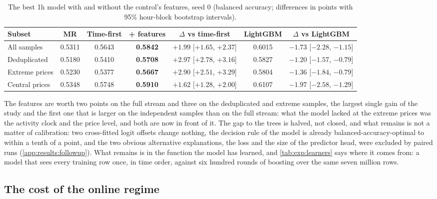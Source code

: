 \begin{table}[t]
\centering
\caption{The best 1h model with and without the control's features, seed 0 (balanced
accuracy; differences in points with 95\% hour-block bootstrap intervals).}
\label{tab:exp:handfeatures}
\small
\begin{fittable}\begin{tabular}{lcccccc}
\toprule
Subset & MR & Time-first & \textbf{+ features} & $\Delta$ vs time-first & LightGBM & $\Delta$ vs LightGBM \\
\midrule
All samples    & 0.5311 & 0.5643 & \textbf{0.5842} & $+1.99$ [$+1.65$, $+2.37$] & 0.6015 & $-1.73$ [$-2.28$, $-1.15$] \\
Deduplicated   & 0.5180 & 0.5410 & \textbf{0.5708} & $+2.97$ [$+2.78$, $+3.16$] & 0.5827 & $-1.20$ [$-1.57$, $-0.79$] \\
Extreme prices & 0.5230 & 0.5377 & \textbf{0.5667} & $+2.90$ [$+2.51$, $+3.29$] & 0.5804 & $-1.36$ [$-1.84$, $-0.79$] \\
Central prices & 0.5348 & 0.5748 & \textbf{0.5910} & $+1.62$ [$+1.28$, $+2.00$] & 0.6107 & $-1.97$ [$-2.58$, $-1.29$] \\
\bottomrule
\end{tabular}\end{fittable}
\end{table}

The features are worth two points on the full stream and three on the deduplicated and
extreme samples, the largest single gain of the study and the first one that is larger on
the independent samples than on the full stream: what the model lacked at the extreme
prices was the activity clock and the price level, and both are now in front of it.  The gap
to the trees is halved, not closed, and what remains is not a matter of calibration: two
cross-fitted logit offsets change nothing, the decision rule of the model is already
balanced-accuracy-optimal to within a tenth of a point, and the two obvious alternative
explanations, the loss and the size of the predictor head, were excluded by paired runs
(\cref{app:results:followup}).  What remains is in the function the model has learned, and
\cref{tab:exp:learners} says where it comes from: a model that sees every training row
once, in time order, against six hundred rounds of boosting over the same seven million
rows.

\subsection{The cost of the online regime}
\label{sec:stateful:regime}

